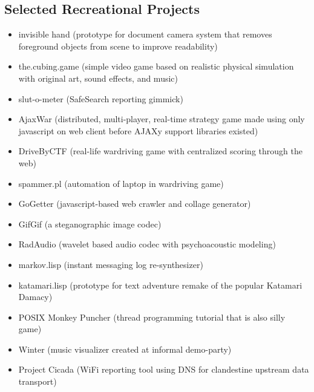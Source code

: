 \documentclass[12pt]{article}
\begin{document}
\subsection*{Selected Recreational Projects}
\begin{itemize}
  \item invisible hand (prototype for document camera system that removes foreground objects from scene to improve readability)
  \item the.cubing.game (simple video game based on realistic physical simulation with original art, sound effects, and music)
  \item slut-o-meter (SafeSearch reporting gimmick)
  \item AjaxWar (distributed, multi-player,  real-time strategy game made using only javascript on web client before AJAXy support libraries existed)
  \item DriveByCTF (real-life wardriving game with centralized scoring through the web)
  \item spammer.pl (automation of laptop in wardriving game)
  \item GoGetter (javascript-based web crawler and collage generator)
  \item GifGif (a steganographic image codec)
  \item RadAudio (wavelet based audio codec with psychoacoustic modeling)
  \item markov.lisp (instant messaging log re-synthesizer)
  \item katamari.lisp (prototype for text adventure remake of the popular Katamari Damacy)
  \item POSIX Monkey Puncher (thread programming tutorial that is also silly game)
  \item Winter (music visualizer created at informal demo-party)
  \item Project Cicada (WiFi reporting tool using DNS for clandestine upstream data transport)
\end{itemize}

\newpage
\end{document}
